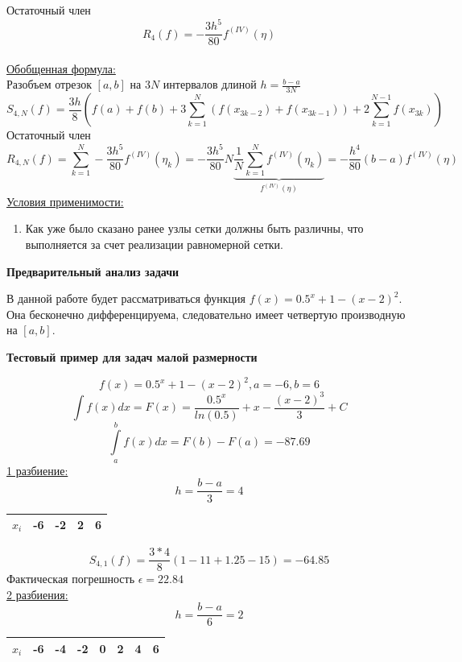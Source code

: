 \documentclass{article}
\begin{document}
	Остаточный член
	\begin{equation}
		R_4(f) = -\frac{3h^5}{80}f^{(IV)}(\eta)
	\end{equation}
	\\
	\underline{Обобщенная формула:}\\
	Разобъем отрезок $[a,b]$ на $3N$ интервалов длиной $h = \frac{b-a}{3N}$
	\begin{equation}
		S_{4, N}(f) = \frac{3h}{8}(f(a) + f(b) + 3\sum_{k=1}^{N}(f(x_{3k-2}) + f(x_{3k-1})) + 2\sum_{k=1}^{N-1}f(x_{3k}))
	\end{equation}
	Остаточный член
	\begin{equation}
		R_{4, N}(f) = \sum_{k=1}^{N}-\frac{3h^5}{80}f^{(IV)}(\eta_k) = -\frac{3h^5}{80}N\underbrace{\frac{1}{N}\sum_{k=1}^{N}f^{(IV)}(\eta_k)}_{f^{(IV)}(\eta)} = -\frac{h^4}{80}(b-a)f^{(IV)}(\eta)
	\end{equation}
	\underline{Условия применимости:}\\
	\begin{enumerate}
		\item Как уже было сказано ранее узлы сетки должны быть различны, что выполняется за счет реализации равномерной сетки.
	\end{enumerate}
	\begin{center} \textbf{Предварительный анализ задачи}\end{center}
	В данной работе будет рассматриваться функция $f(x) = 0.5^x + 1 - (x-2)^2$. Она бесконечно дифференцируема, следовательно имеет четвертую производную на $[a,b]$.
	\begin{center} \textbf{Тестовый пример для задач малой размерности}\end{center}
	$$f(x) = 0.5^x + 1 - (x-2)^2, a = -6, b = 6$$
	$$\int f(x)dx = F(x) = \frac{0.5^x}{ln(0.5)} + x - \frac{(x-2)^3}{3} + C$$
	$$\int\limits_a^bf(x)dx = F(b) - F(a) = -87.69$$
	\underline{1 разбиение:}\\
	$$h = \frac{b-a}{3} = 4$$
	\begin{center}
		\begin{tabular}{|c|c|c|c|c|}
			\hline
			$x_i$ & -6 & -2 & 2 & 6 \\ 
			\hline
		\end{tabular}
	\end{center}
	$$S_{4, 1}(f) = \frac{3*4}{8}(1 - 11 + 1.25 - 15) = -64.85$$
	Фактическая погрешность $\epsilon = 22.84$\\
	\underline{2 разбиения:}\\
	$$h = \frac{b-a}{6} = 2$$
	\begin{center}
		\begin{tabular}{|c|c|c|c|c|c|c|c|}
			\hline
			$x_i$ & -6 & -4 & -2 & 0 & 2 & 4 & 6 \\ 
			\hline
		\end{tabular}
	\end{center}
\end{document}
